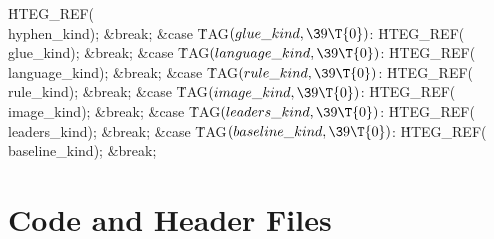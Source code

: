 \.{HTEG\_REF}(\\{hyphen\_kind});\5
\&{break};\6
\4\&{case} \.{TAG}${}(\index{glue kind+\\{glue\_kind}}\\{glue\_kind},\39\T{0}){}$:\5
\.{HTEG\_REF}(\\{glue\_kind});\5
\&{break};\6
\4\&{case} \.{TAG}${}(\index{language kind+\\{language\_kind}}\\{language\_kind},\39\T{0}){}$:\5
\.{HTEG\_REF}(\\{language\_kind});\5
\&{break};\6
\4\&{case} \.{TAG}${}(\index{rule kind+\\{rule\_kind}}\\{rule\_kind},\39\T{0}){}$:\5
\.{HTEG\_REF}(\\{rule\_kind});\5
\&{break};\6
\4\&{case} \.{TAG}${}(\index{image kind+\\{image\_kind}}\\{image\_kind},\39\T{0}){}$:\5
\.{HTEG\_REF}(\\{image\_kind});\5
\&{break};\6
\4\&{case} \.{TAG}${}(\index{leaders kind+\\{leaders\_kind}}\\{leaders\_kind},\39\T{0}){}$:\5
\.{HTEG\_REF}(\\{leaders\_kind});\5
\&{break};\6
\4\&{case} \.{TAG}${}(\index{baseline kind+\\{baseline\_kind}}\\{baseline\_kind},\39\T{0}){}$:\5
\.{HTEG\_REF}(\\{baseline\_kind});\5
\&{break};
\Y
\fi



\section{Code and Header Files}

